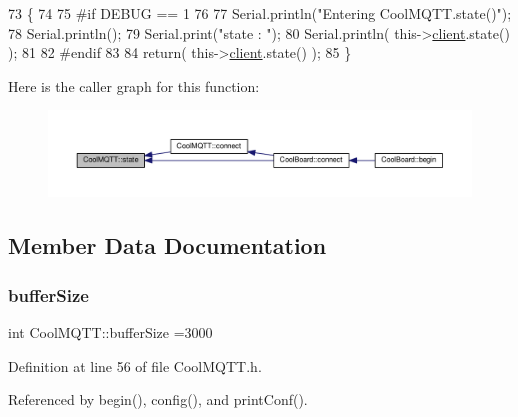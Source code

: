 \begin{DoxyCode}
73 \{
74 
75 \textcolor{preprocessor}{#if DEBUG == 1 }
76 
77     Serial.println(\textcolor{stringliteral}{"Entering CoolMQTT.state()"});
78     Serial.println();   
79     Serial.print(\textcolor{stringliteral}{"state : "});
80     Serial.println( this->\hyperlink{classCoolMQTT_a4ca71e4f76ef868692a297efd45b1415}{client}.state() );
81 
82 \textcolor{preprocessor}{#endif}
83     
84     \textcolor{keywordflow}{return}( this->\hyperlink{classCoolMQTT_a4ca71e4f76ef868692a297efd45b1415}{client}.state() );
85 \}
\end{DoxyCode}
Here is the caller graph for this function\+:
\nopagebreak
\begin{figure}[H]
\begin{center}
\leavevmode
\includegraphics[width=350pt]{classCoolMQTT_a5d003307eff78efbd585e42b43b72b6d_icgraph}
\end{center}
\end{figure}


\subsection{Member Data Documentation}
\mbox{\label{classCoolMQTT_a7f3cf26b51d6770f216e42c5ef13ca9f}} 
\subsubsection{\texorpdfstring{buffer\+Size}{bufferSize}}
{\footnotesize\ttfamily int Cool\+M\+Q\+T\+T\+::buffer\+Size =3000\hspace{0.3cm}{\ttfamily [private]}}



Definition at line 56 of file Cool\+M\+Q\+T\+T.\+h.



Referenced by begin(), config(), and print\+Conf().

\mbox{\label{classCoolMQTT_a4ca71e4f76ef868692a297efd45b1415}} 
